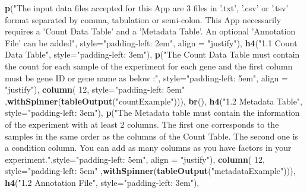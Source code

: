 \documentclass[
  12pt,
]{article}
\newenvironment{Shaded}{\begin{snugshade}}{\end{snugshade}}
\newcommand{\DataTypeTok}[1]{\textcolor[rgb]{0.13,0.29,0.53}{#1}}
\newcommand{\DecValTok}[1]{\textcolor[rgb]{0.00,0.00,0.81}{#1}}
\newcommand{\KeywordTok}[1]{\textcolor[rgb]{0.13,0.29,0.53}{\textbf{#1}}}
\newcommand{\NormalTok}[1]{#1}
\newcommand{\StringTok}[1]{\textcolor[rgb]{0.31,0.60,0.02}{#1}}
\begin{document}
\begin{Shaded}
\begin{Highlighting}[]
                      \KeywordTok{p}\NormalTok{(}\StringTok{"The input data files accepted for this App are 3 files in '.txt', '.csv' or '.tsv' }
\StringTok{                      format separated by comma, tabulation or semi-colon.}
\StringTok{                        This App necessarily requires a 'Count Data Table' and a 'Metadata Table'. An optional }
\StringTok{                      'Annotation File' can be added"}\NormalTok{, }\DataTypeTok{style=}\StringTok{"padding-left: 2em"}\NormalTok{, }\DataTypeTok{align =} \StringTok{"justify"}\NormalTok{),}
                      \KeywordTok{h4}\NormalTok{(}\StringTok{"1.1 Count Data Table"}\NormalTok{, }\DataTypeTok{style=}\StringTok{"padding-left: 3em"}\NormalTok{),}
                      \KeywordTok{p}\NormalTok{(}\StringTok{"The Count Data Table must contain the count for each sample of the experiment for each }
\StringTok{                        gene and the first column must be gene ID or gene name as below :"}\NormalTok{,}
                        \DataTypeTok{style=}\StringTok{"padding-left: 5em"}\NormalTok{, }\DataTypeTok{align =} \StringTok{"justify"}\NormalTok{),}
                      \KeywordTok{column}\NormalTok{( }\DecValTok{12}\NormalTok{, }\DataTypeTok{style=}\StringTok{"padding-left: 5em"}\NormalTok{ ,}\KeywordTok{withSpinner}\NormalTok{(}\KeywordTok{tableOutput}\NormalTok{(}\StringTok{"countExample"}\NormalTok{))),}
                      \KeywordTok{br}\NormalTok{(),}
                      \KeywordTok{h4}\NormalTok{(}\StringTok{"1.2 Metadata Table"}\NormalTok{, }\DataTypeTok{style=}\StringTok{"padding-left: 3em"}\NormalTok{),}
                      \KeywordTok{p}\NormalTok{(}\StringTok{"The Metadata table must contain the information of the experiment with at least }
\StringTok{                      2 columns. The first one corresponds to the samples in the same order as the columns of }
\StringTok{                      the Count Table. }
\StringTok{                        The second one is a condition column. You can add as many columns as you have factors }
\StringTok{                      in your experiment."}\NormalTok{,}\DataTypeTok{style=}\StringTok{"padding-left: 5em"}\NormalTok{, }\DataTypeTok{align =} \StringTok{"justify"}\NormalTok{),}
                      \KeywordTok{column}\NormalTok{( }\DecValTok{12}\NormalTok{, }\DataTypeTok{style=}\StringTok{"padding-left: 5em"}\NormalTok{ ,}\KeywordTok{withSpinner}\NormalTok{(}\KeywordTok{tableOutput}\NormalTok{(}\StringTok{"metadataExample"}\NormalTok{))),}
                      \KeywordTok{h4}\NormalTok{(}\StringTok{"1.2  Annotation File"}\NormalTok{, }\DataTypeTok{style=}\StringTok{"padding-left: 3em"}\NormalTok{),}

\end{Highlighting}
\end{Shaded}
\end{document}
